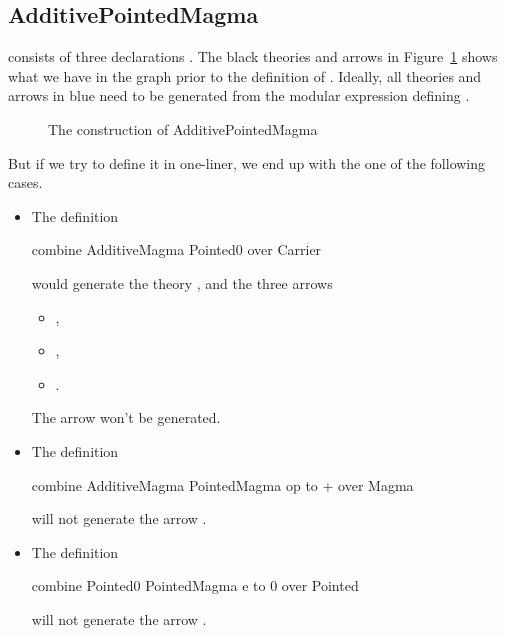 \subsection{AdditivePointedMagma}
 consists of three declarations . 
The black theories and arrows in Figure~\ref{fig:addPointedMagma} shows what we  have in the graph prior to the definition of . Ideally, all theories and arrows in blue need to be generated from the modular expression defining . 
\begin{figure}[h]
    \caption{The construction of AdditivePointedMagma}
    \label{fig:addPointedMagma}
\end{figure}
But if we try to define it in one-liner, we end up with the one of the following cases. 
\begin{itemize}
 \item The definition 
\begin{togcode}
combine AdditiveMagma {} Pointed0 {} over Carrier
\end{togcode}
would generate the theory , and the three arrows 
\begin{itemize}
    \item {}, 
    \item {}, 
    \item {}. 
\end{itemize}
The arrow  won't be generated. 

\item The definition 
\begin{togcode}
combine AdditiveMagma {} PointedMagma {op to +} over Magma 
\end{togcode}
will not generate the arrow . 

\item The definition 
\begin{togcode}
combine Pointed0 {} PointedMagma {e to 0} over Pointed 
\end{togcode}
will not generate the arrow . 
\end{itemize}
